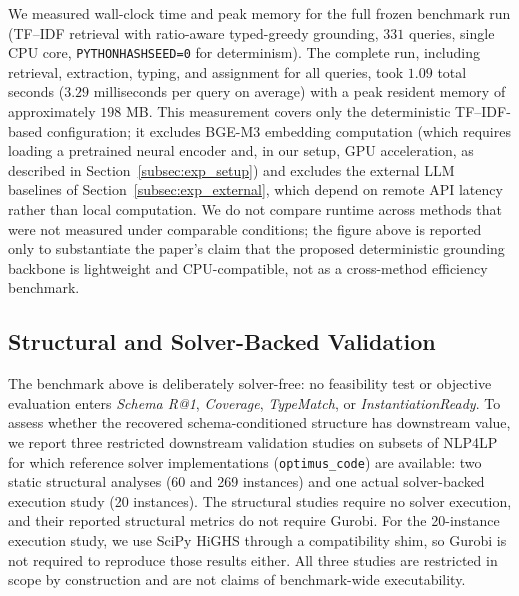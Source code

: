 \documentclass[pdflatex,sn-basic,Numbered]{sn-jnl}
\begin{document}
We measured wall-clock time and peak memory for the full frozen benchmark run (TF--IDF retrieval with ratio-aware typed-greedy grounding, $331$ queries, single CPU core, \texttt{PYTHONHASHSEED=0} for determinism). The complete run, including retrieval, extraction, typing, and assignment for all queries, took $1.09$ total seconds ($3.29$ milliseconds per query on average) with a peak resident memory of approximately $198$ MB. This measurement covers only the deterministic TF--IDF-based configuration; it excludes BGE-M3 embedding computation (which requires loading a pretrained neural encoder and, in our setup, GPU acceleration, as described in Section~\ref{subsec:exp_setup}) and excludes the external LLM baselines of Section~\ref{subsec:exp_external}, which depend on remote API latency rather than local computation. We do not compare runtime across methods that were not measured under comparable conditions; the figure above is reported only to substantiate the paper's claim that the proposed deterministic grounding backbone is lightweight and CPU-compatible, not as a cross-method efficiency benchmark.

\subsection{Structural and Solver-Backed Validation}
\label{subsec:exp_engineering}

The benchmark above is deliberately solver-free: no feasibility test or objective evaluation enters \textit{Schema R@1}, \textit{Coverage}, \textit{TypeMatch}, or \textit{InstantiationReady}. To assess whether the recovered schema-conditioned structure has downstream value, we report three restricted downstream validation studies on subsets of \textsc{NLP4LP} for which reference solver implementations (\texttt{optimus\_code}) are available: two static structural analyses (60 and 269 instances) and one actual solver-backed execution study (20 instances). The structural studies require no solver execution, and their reported structural metrics do not require Gurobi. For the 20-instance execution study, we use SciPy HiGHS through a compatibility shim, so Gurobi is not required to reproduce those results either. All three studies are restricted in scope by construction and are not claims of benchmark-wide executability.
\end{document}
